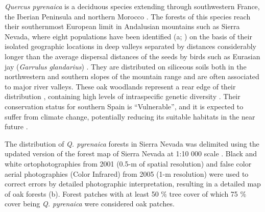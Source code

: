\emph{Quercus pyrenaica} is a deciduous species extending through southwestern France, the Iberian Peninsula and northern Morocco \autocite{Franco1990Quercus}. The forests of this species reach their southernmost European limit in Andalusian mountains such as Sierra Nevada, where eight populations have been identified (a; ) on the basis of their isolated geographic locations in deep valleys separated by distances considerably longer than the average dispersal distances of the seeds by birds such as Eurasian jay (\emph{Garrulus glandarius}) \autocite{Gomez2003SpatialPatterns,ValbuenaCarabanaetal2005GeneFlow}. They are distributed on siliceous soils both in the northwestern and southern slopes of the mountain range and are often associated to major river valleys. These oak woodlands represent a rear edge of their distribution \autocite{HampePetit2005ConservingBiodiversity}, containing high levels of intraspecific genetic diversity \autocite{ValbuenaCarabanaGil2013GeneticResilience}. Their conservation status for southern Spain is ``Vulnerable'', and it is expected to suffer from climate change, potentially reducing its suitable habitats in the near future \autocite{GeaIzquierdoetal2013GrowthProjections,GeaIzquierdoetal2017RiskyFuture}.

The distribution of \emph{Q. pyrenaica} forests in Sierra Nevada was delimited using the updated version of the forest map of Sierra Nevada at 1:10 000 scale \autocite{CMAOT2014CartografiaEvaluacion,PerezLuqueetal2019MapEcosystems}. Black and white ortophotographies from 2001 (0.5-m of spatial resolution) and false color aerial photographies (Color Infrared) from 2005 (1-m resolution) were used to correct errors by detailed photographic interpretation, resulting in a detailed map of oak forests (b). Forest patches with at least 50 \% tree cover of which 75 \% cover being \emph{Q. pyrenaica} were considered oak patches.

